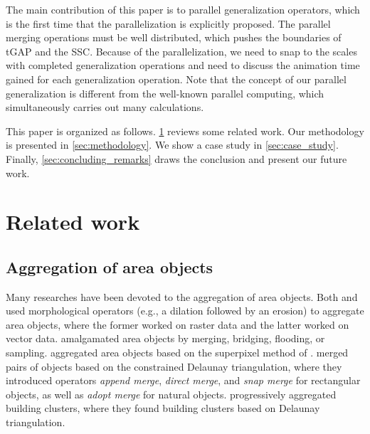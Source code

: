 \documentclass[]{interact}
\begin{document}
The main contribution of this paper is 
to parallel generalization operators,
which is the first time that the parallelization 
is explicitly proposed.
The parallel merging operations must be well distributed,
which pushes the boundaries of tGAP and the SSC.
Because of the parallelization, 
we need to snap to the scales with completed generalization operations
and need to discuss the animation time gained for each generalization operation.
Note that the concept of our parallel generalization is 
different from the well-known parallel computing, 
which simultaneously carries out many calculations.


This paper is organized as follows.
\sect\ref{sec:realted_work} reviews some related work.
Our methodology is presented in \sect\ref{sec:methodology}.
We show a case study in \sect\ref{sec:case_study}.
Finally, \sect\ref{sec:concluding_remarks} draws the conclusion
and present our future work.




\section{Related work}
\label{sec:realted_work}





\subsection{Aggregation of area objects}
Many researches have been devoted to the aggregation of area objects.
Both \citet{Su1997aggregation} and \citet{Sester2005Optimization} 
used morphological operators (e.g., a dilation followed by an erosion)
to aggregate area objects, 
where the former worked on raster data and the latter worked on vector data.
\citet{Regnauld2003Amalgamation} 
amalgamated area objects
by merging, bridging, flooding, or sampling. 
\citet{Shen2019Aggregation} aggregated area objects
based on the superpixel method of \citet{Achanta2012SLIC}.
\citet{Ware1995Areal} merged pairs of objects 
based on the constrained Delaunay triangulation,
where they introduced operators 
\emph{append merge}, \emph{direct merge}, and \emph{snap merge}
for rectangular objects, as well as \emph{adopt merge} for natural objects. 
\citet{Ai2007Aggregation} progressively aggregated building clusters,
where they found building clusters based on Delaunay triangulation.
\end{document}
